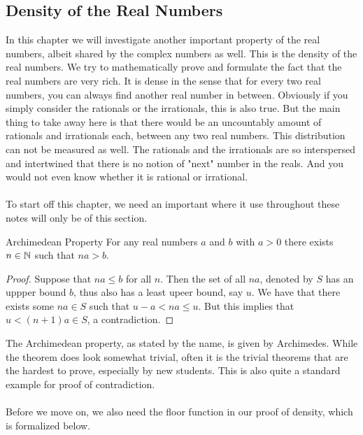 \documentclass[a4paper]{article}
\begin{document}
\subsection{Density of the Real Numbers}
In this chapter we will investigate another important property of the real numbers, albeit shared by the complex numbers as well. This is the density of the real numbers. We try to mathematically prove and formulate the fact that the real numbers are very rich. It is dense in the sense that for every two real numbers, you can always find another real number in between. Obviously if you simply consider the rationals or the irrationals, this is also true. But the main thing to take away here is that there would be an uncountably amount of rationals and irrationals each, between any two real numbers. This distribution can not be measured as well. The rationals and the irrationals are so interspersed and intertwined that there is no notion of "next" number in the reals. And you would not even know whether it is rational or irrational. \\~\\

To start off this chapter, we need an important where it use throughout these notes will only be of this section. 

\begin{thm}{Archimedean Property}{} For any real numbers $a$ and $b$ with $a>0$ there exists $n\in\mathbb{N}$ such that $na>b$. \tcbline
\begin{proof} Suppose that $na\leq b$ for all $n$. Then the set of all $na$, denoted by $S$ has an uppper bound $b$, thus also has a least upeer bound, say $u$. We have that there exists some $na\in S$ such that $u-a<na\leq u$. But this implies that $u<(n+1)a\in S$, a contradiction. 
\end{proof}
\end{thm}

The Archimedean property, as stated by the name, is given by Archimedes. While the theorem does look somewhat trivial, often it is the trivial theorems that are the hardest to prove, especially by new students. This is also quite a standard example for proof of contradiction. \\~\\

Before we move on, we also need the floor function in our proof of density, which is formalized below. 
\end{document}
